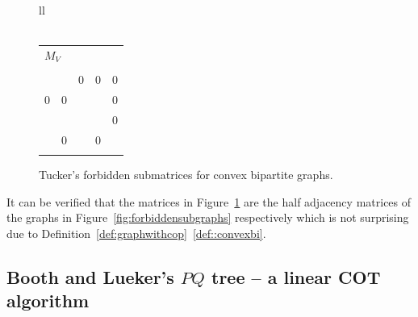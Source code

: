 \begin{figure}[htbp]
\begin{tabular}[h]{ll}
    \\\\%
    \begin{tabular}[t]{|lllll|}  %
      \multicolumn{5}{l}{\normalsize \hspace{-0.5in}$M_{V}$} \\
      \multicolumn{5}{l}{} \\
      \firsthline
      \un & \un & 0   & 0   & 0   \\
      0   & 0   & \un & \un & 0   \\
      \un & \un & \un & \un & 0   \\
      \un & 0   & \un & 0   & \un \\
      \lasthline
    \end{tabular}
  \end{tabular}

    



  \caption[\figtabsize Tucker's forbidden submatrices]{\figtabsize Tucker's
    forbidden submatrices for convex bipartite graphs. \cite{at72}} 
  \label{fig:forbiddensubmatrices}
\end{figure}
 












It can be verified that the matrices in
Figure~\ref{fig:forbiddensubmatrices} are the half adjacency matrices
of the graphs in Figure~\ref{fig:forbiddensubgraphs} respectively
which is not surprising due to
Definition~\ref{def:graphwithcop}~\ref{def::convexbi}.

\subsection{Booth and Lueker's $PQ$ tree -- a linear COT algorithm}


